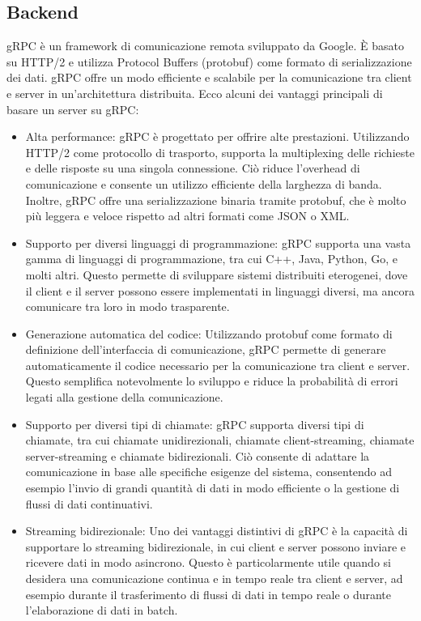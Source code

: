 \documentclass[a4paper,12pt]{report}
\begin{document}
    \subsection{Backend}
    gRPC \cite{grpc} è un framework di comunicazione remota sviluppato da Google. È basato su HTTP/2 e utilizza Protocol Buffers (protobuf) come formato di serializzazione dei dati. gRPC offre un modo efficiente e scalabile per la comunicazione tra client e server in un'architettura distribuita. Ecco alcuni dei vantaggi principali di basare un server su gRPC:
    \begin{itemize}
      \item Alta performance: gRPC è progettato per offrire alte prestazioni. Utilizzando HTTP/2 come protocollo di trasporto, supporta la multiplexing delle richieste e delle risposte su una singola connessione. Ciò riduce l'overhead di comunicazione e consente un utilizzo efficiente della larghezza di banda. Inoltre, gRPC offre una serializzazione binaria tramite protobuf, che è molto più leggera e veloce rispetto ad altri formati come JSON o XML.
      \item Supporto per diversi linguaggi di programmazione: gRPC supporta una vasta gamma di linguaggi di programmazione, tra cui C++, Java, Python, Go, e molti altri. Questo permette di sviluppare sistemi distribuiti eterogenei, dove il client e il server possono essere implementati in linguaggi diversi, ma ancora comunicare tra loro in modo trasparente.
      \item Generazione automatica del codice: Utilizzando protobuf come formato di definizione dell'interfaccia di comunicazione, gRPC permette di generare automaticamente il codice necessario per la comunicazione tra client e server. Questo semplifica notevolmente lo sviluppo e riduce la probabilità di errori legati alla gestione della comunicazione.
      \item Supporto per diversi tipi di chiamate: gRPC supporta diversi tipi di chiamate, tra cui chiamate unidirezionali, chiamate client-streaming, chiamate server-streaming e chiamate bidirezionali. Ciò consente di adattare la comunicazione in base alle specifiche esigenze del sistema, consentendo ad esempio l'invio di grandi quantità di dati in modo efficiente o la gestione di flussi di dati continuativi.
      \item Streaming bidirezionale: Uno dei vantaggi distintivi di gRPC è la capacità di supportare lo streaming bidirezionale, in cui client e server possono inviare e ricevere dati in modo asincrono. Questo è particolarmente utile quando si desidera una comunicazione continua e in tempo reale tra client e server, ad esempio durante il trasferimento di flussi di dati in tempo reale o durante l'elaborazione di dati in batch.
    \end{itemize}
\end{document}
